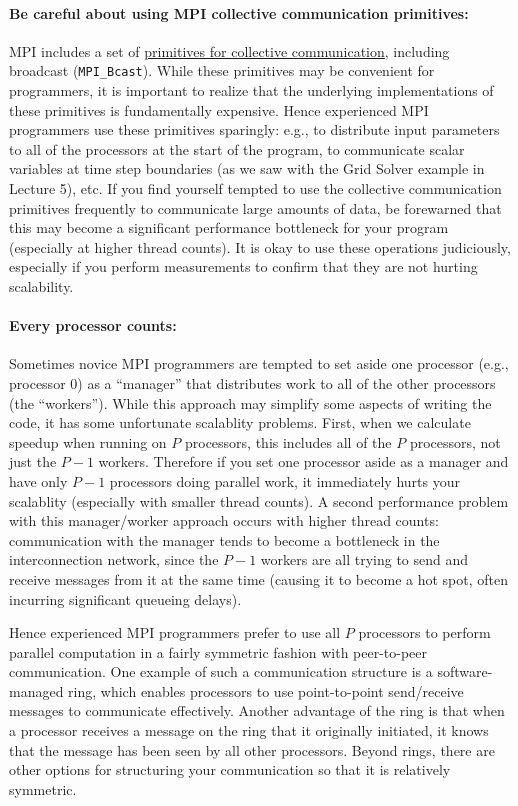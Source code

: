 \documentclass[11pt]{article}
\begin{document}
\paragraph{Be careful about using MPI collective communication primitives:}
MPI includes a set of \href{https://hpc-tutorials.llnl.gov/mpi/collective_communication_routines/}{primitives for collective communication}, including broadcast (\texttt{MPI\_Bcast}). While these primitives may be convenient for programmers, it is important to realize that the underlying implementations of these primitives is fundamentally expensive. Hence experienced MPI programmers use these primitives sparingly: e.g., to distribute input parameters to all of the processors at the start of the program, to communicate scalar variables at time step boundaries (as we saw with the Grid Solver example in Lecture 5), etc. If you find yourself tempted to use the collective communication primitives frequently to communicate large amounts of data, be forewarned that this may become a significant performance bottleneck for your program (especially at higher thread counts). It is okay to use these operations judiciously, especially if you perform measurements to confirm that they are not hurting scalability.

\paragraph{Every processor counts:}
Sometimes novice MPI programmers are tempted to set aside one processor (e.g., processor 0) as a ``manager'' that distributes work to all of the other processors (the ``workers''). While this approach may simplify some aspects of writing the code, it has some unfortunate scalablity problems. First, when we calculate speedup when running on $P$ processors, this includes all of the $P$ processors, not just the $P - 1$ workers. Therefore if you set one processor aside as a manager and have only $P - 1$ processors doing parallel work, it immediately hurts your scalablity (especially with smaller thread counts). A second performance problem with this manager/worker approach occurs with higher thread counts: communication with the manager tends to become a bottleneck in the interconnection network, since the $P - 1$ workers are all trying to send and receive messages from it at the same time (causing it to become a hot spot, often incurring significant queueing delays).

Hence experienced MPI programmers prefer to use all $P$ processors to perform parallel computation in a fairly symmetric fashion with peer-to-peer communication. One example of such a communication structure is a software-managed ring, which enables processors to use point-to-point send/receive messages to communicate effectively. Another advantage of the ring is that when a processor receives a message on the ring that it originally initiated, it knows that the message has been seen by all other processors. Beyond rings, there are other options for structuring your communication so that it is relatively symmetric.
\end{document}
